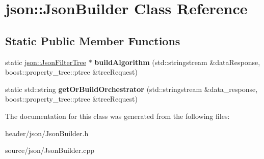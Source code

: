 \hypertarget{classjson_1_1_json_builder}{}\section{json\+:\+:Json\+Builder Class Reference}
\label{classjson_1_1_json_builder}
\subsection*{Static Public Member Functions}
\begin{DoxyCompactItemize}
\item 
\mbox{\label{classjson_1_1_json_builder_a61ed78182f56e5a6f105164d4dd8d36a}} 
static \hyperlink{classjson_1_1_json_filter_tree}{json\+::\+Json\+Filter\+Tree} $\ast$ {\bfseries build\+Algorithm} (std\+::stringstream \&data\+Response, boost\+::property\+\_\+tree\+::ptree \&tree\+Request)
\item 
\mbox{\label{classjson_1_1_json_builder_ad94b8ff719a5321d058e8e8472fd6443}} 
static std\+::string {\bfseries get\+Or\+Build\+Orchestrator} (std\+::stringstream \&data\+\_\+response, boost\+::property\+\_\+tree\+::ptree \&tree\+Request)
\end{DoxyCompactItemize}


The documentation for this class was generated from the following files\+:\begin{DoxyCompactItemize}
\item 
header/json/Json\+Builder.\+h\item 
source/json/Json\+Builder.\+cpp\end{DoxyCompactItemize}
